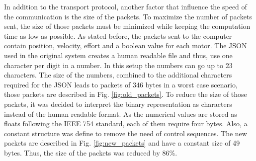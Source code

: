 In addition to the transport protocol, another factor that influence the speed of the communication is the size of the packets. To maximize the number of packets sent, the size of those packets must be minimized while keeping the computation time as low as possible. As stated before, the packets sent to the computer contain position, velocity, effort and a boolean value for each motor. The JSON used in the original system creates a human readable file and thus, use one character per digit in a number. In this setup the numbers can go up to 23 characters. The size of the numbers, combined to the additional characters required for the JSON leads to packets of 346 bytes in a worst case scenario, those packets are described in Fig. \ref{fig:old_packets}. To reduce the size of those packets, it was decided to interpret the binary representation as characters instead of the human readable format. As the numerical values are stored as floats following the IEEE 754 standard\cite{IEEE_754}, each of them require four bytes. Also, a constant structure was define to remove the need of control sequences. The new packets are described in Fig. \ref{fig:new_packets} and have a constant size of 49 bytes. Thus, the size of the packets was reduced by 86\%.

